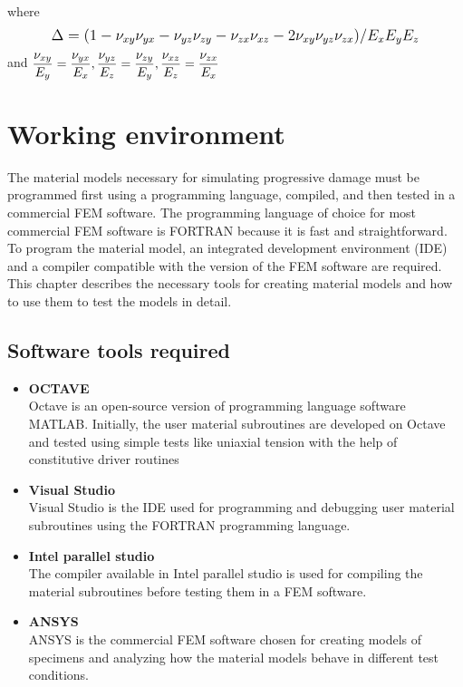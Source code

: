 \documentclass[12pt,twoside]{report}
\begin{document}
 where 
 \begin{align*}
\mathlarger{ \Delta = (1 - \nu_{xy}\nu_{yx} - \nu_{yz}\nu_{zy} - \nu_{zx}\nu_{xz} - 2\nu_{xy}\nu_{yz}\nu_{zx})/E_{x}E_{y}E_{z}}
 \end{align*}
   and  $\mathlarger{\frac{\nu_{xy}}{E_{y}} = \frac{\nu_{yx}}{E_{x}}, \frac{\nu_{yz}}{E_{z}} = \frac{\nu_{zy}}{E_{y}}, \frac{\nu_{xz}}{E_{z}} = \frac{\nu_{zx}}{E_{x}} }$ 


\newpage
\vspace*{3cm}
\chapter{Working environment}
\vspace*{1cm}
\indent\indent\indent  The material models necessary for simulating progressive damage must be programmed first using a programming language, compiled, and then tested in a commercial FEM software. The programming language of choice for most commercial FEM software is FORTRAN because it is fast and straightforward. To program the material model, an integrated development environment (IDE) and a compiler compatible with the version of the FEM software are required. This chapter describes the necessary tools for creating material models and how to use them to test the models in detail.   
\vspace*{1cm}
\section{Software tools required}
\begin{itemize}
\item \textbf{OCTAVE}\\ \indent
\hspace*{13mm} Octave is an open-source version of programming language software MATLAB. Initially, the user material subroutines are developed on Octave and tested using simple tests like uniaxial tension with the help of constitutive driver routines
\item \textbf{Visual Studio }\\
\hspace*{13mm} Visual Studio is the IDE used for programming and debugging user material subroutines using the FORTRAN programming language.
\item \textbf{Intel parallel studio}\\
\hspace*{13mm} The compiler available in Intel parallel studio is used for compiling the material subroutines before testing them in a FEM software.
\item \textbf{ANSYS }\\
\hspace*{13mm}ANSYS is the commercial FEM software chosen for creating models of specimens and analyzing how the material models behave in different test conditions.
\end{itemize}
\end{document}
